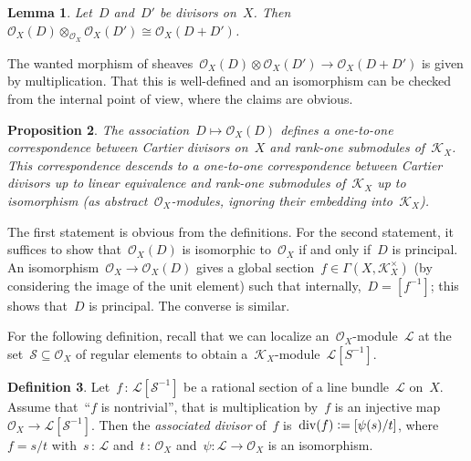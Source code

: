 \documentclass[10pt,reqno,a4paper]{amsbook}
\makeatletter
\theoremstyle{definition}
\newtheorem{defn}{Definition}[section]
\theoremstyle{plain}
\newtheorem{prop}[defn]{Proposition}
\newtheorem{lemma}[defn]{Lemma}
\theoremstyle{remark}
\newtheorem{rem}[defn]{Remark}
\renewcommand{\O}{\mathcal{O}}
\newcommand{\K}{\mathcal{K}}
\renewcommand{\L}{\mathcal{L}}
\renewcommand{\S}{\mathcal{S}}
\newcommand{\?}{\,{:}\,}
\renewcommand{\_}{\mathpunct{.}\,}
\newcommand{\defeq}{\vcentcolon=}
\renewenvironment{proof}[1][\proofname]{\par
  \pushQED{\qed}%
  \normalfont \topsep6\p@\@plus6\p@\relax
  \trivlist
  \item[\hskip\labelsep
        \itshape
    #1\@addpunct{.}]\ignorespaces
}{%
  \popQED\endtrivlist\@endpefalse
}
\makeatother
\begin{document}
\begin{lemma}Let~$D$ and~$D'$ be divisors on~$X$. Then~$\O_X(D) \otimes_{\O_X}
\O_X(D') \cong \O_X(D + D')$.\end{lemma}
\begin{proof}The wanted morphism of sheaves~$\O_X(D) \otimes \O_X(D') \to
\O_X(D + D')$ is given by multiplication. That this is well-defined and an
isomorphism can be checked from the internal point of view, where the claims
are obvious.\end{proof}

\begin{prop}The association~$D \mapsto \O_X(D)$ defines a one-to-one
correspondence between Cartier divisors on~$X$ and rank-one submodules
of~$\K_X$. This correspondence descends to a one-to-one correspondence between
Cartier divisors up to linear equivalence and rank-one submodules of~$\K_X$ up
to isomorphism (as abstract~$\O_X$-modules, ignoring their embedding
into~$\K_X$).\end{prop}
\begin{proof}The first statement is obvious from the definitions. For the
second statement, it suffices to show that~$\O_X(D)$ is isomorphic to~$\O_X$ if
and only if~$D$ is principal. An isomorphism~$\O_X \to \O_X(D)$ gives a
global section~$f \in \Gamma(X,\K_X^\times)$ (by considering the image of the unit element)
such that internally,~$D = [f^{-1}]$; this shows that~$D$ is principal. The
converse is similar.
\end{proof}


For the following definition, recall that we can localize an~$\O_X$-module~$\L$
at the set~$\S \subseteq \O_X$ of regular elements to obtain
a~$\K_X$-module~$\L[S^{-1}]$.

\begin{defn}Let~$f\?\L[\S^{-1}]$ be a rational section of a line bundle~$\L$
on~$X$. Assume that~``$f$ is nontrivial'', that is multiplication by~$f$ is an
injective map~$\O_X \to \L[\S^{-1}]$. Then the \emph{associated divisor} of~$f$
is~$\operatorname{div}(f) \defeq [\psi(s)/t]$, where~$f = s/t$ with~$s\?\L$ and~$t\?\O_X$
and~$\psi : \L \to \O_X$ is an isomorphism.\end{defn}
\end{document}
